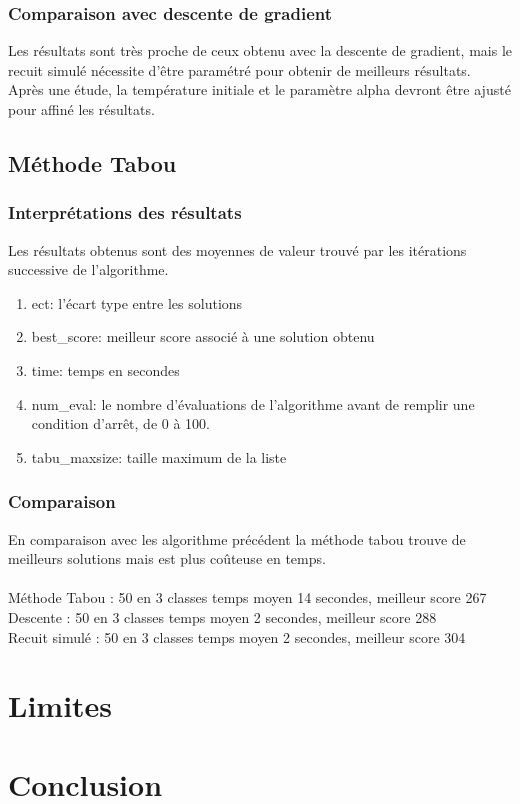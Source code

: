 \documentclass[a4paper]{article}
\begin{document}
		\subsubsection{Comparaison avec descente de gradient}
			Les résultats sont très proche de ceux obtenu avec la descente de gradient, mais le recuit simulé nécessite d’être paramétré pour obtenir de meilleurs résultats.\\
			Après une étude, la température initiale et le paramètre alpha devront être ajusté pour affiné les résultats.

	\subsection{Méthode Tabou}
		\subsubsection{Interprétations des résultats}
			Les résultats obtenus sont des moyennes de valeur trouvé par les itérations successive de l'algorithme.\\
			\begin{enumerate}
				\item{ect}: l'écart type entre les solutions
				\item{best\_score}: meilleur score associé à une solution obtenu
				\item{time}: temps en secondes
				\item{num\_eval}: le nombre d'évaluations de l'algorithme avant de remplir une condition d'arrêt, de 0 à 100.
				\item{tabu\_maxsize}: taille maximum de la liste
			\end{enumerate}

		\subsubsection{Comparaison}
		 En comparaison avec les algorithme précédent la méthode tabou trouve de meilleurs solutions mais est plus coûteuse en temps.\\\\
		 Méthode Tabou : 50 en 3 classes temps moyen 14 secondes, meilleur score 267\\
		 Descente : 50 en 3 classes temps moyen 2 secondes, meilleur score 288\\
		 Recuit simulé : 50 en 3 classes temps moyen 2 secondes, meilleur score 304\\

\section{Limites}

\section{Conclusion}
\end{document}
